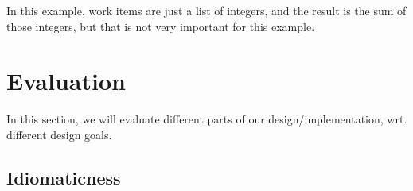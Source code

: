 \documentclass[a4paper]{article}
\begin{document}
\noindent
In this example, work items are just a list of integers, and the result is the
sum of those integers, but that is not very important for this example.

%


\section{Evaluation}
In this section, we will evaluate different parts of our design/implementation,
wrt. different design goals.

\subsection{Idiomaticness}
\end{document}
